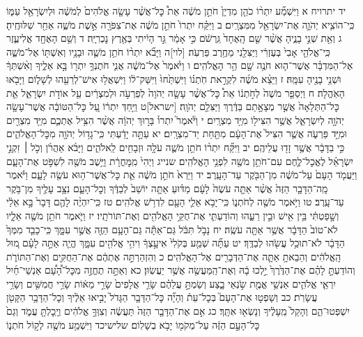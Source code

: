 \documentclass[twoside, openany, parskip=half, 11pt]{book}
\begin{document}
יד יתרויח א וַיִּשְׁמַ֞ע יִתְר֨וֹ כֹהֵ֤ן מִדְיָן֙ חֹתֵ֣ן מֹשֶׁ֔ה אֵת֩ כׇּל־אֲשֶׁ֨ר עָשָׂ֤ה אֱלֹהִים֙ לְמֹשֶׁ֔ה וּלְיִשְׂרָאֵ֖ל עַמּ֑וֹ כִּֽי־הוֹצִ֧יא יְהֹוָ֛ה אֶת־יִשְׂרָאֵ֖ל מִמִּצְרָֽיִם׃ ב וַיִּקַּ֗ח יִתְרוֹ֙ חֹתֵ֣ן מֹשֶׁ֔ה אֶת־צִפֹּרָ֖ה אֵ֣שֶׁת מֹשֶׁ֑ה אַחַ֖ר שִׁלּוּחֶֽיהָ׃ ג וְאֵ֖ת שְׁנֵ֣י בָנֶ֑יהָ אֲשֶׁ֨ר שֵׁ֤ם הָֽאֶחָד֙ גֵּֽרְשֹׁ֔ם כִּ֣י אָמַ֔ר גֵּ֣ר הָיִ֔יתִי בְּאֶ֖רֶץ נׇכְרִיָּֽה׃ ד וְשֵׁ֥ם הָאֶחָ֖ד אֱלִיעֶ֑זֶר כִּֽי־אֱלֹהֵ֤י אָבִי֙ בְּעֶזְרִ֔י וַיַּצִּלֵ֖נִי מֵחֶ֥רֶב פַּרְעֹֽה׃ [לוי]ה וַיָּבֹ֞א יִתְר֨וֹ חֹתֵ֥ן מֹשֶׁ֛ה וּבָנָ֥יו וְאִשְׁתּ֖וֹ אֶל־מֹשֶׁ֑ה אֶל־הַמִּדְבָּ֗ר אֲשֶׁר־ה֛וּא חֹנֶ֥ה שָׁ֖ם הַ֥ר הָאֱלֹהִֽים׃ ו וַיֹּ֙אמֶר֙ אֶל־מֹשֶׁ֔ה אֲנִ֛י חֹתֶנְךָ֥ יִתְר֖וֹ בָּ֣א אֵלֶ֑יךָ וְאִ֨שְׁתְּךָ֔ וּשְׁנֵ֥י בָנֶ֖יהָ עִמָּֽהּ׃ ז וַיֵּצֵ֨א מֹשֶׁ֜ה לִקְרַ֣את חֹֽתְנ֗וֹ וַיִּשְׁתַּ֙חוּ֙ וַיִּשַּׁק־ל֔וֹ וַיִּשְׁאֲל֥וּ אִישׁ־לְרֵעֵ֖הוּ לְשָׁל֑וֹם וַיָּבֹ֖אוּ הָאֹֽהֱלָה׃ ח וַיְסַפֵּ֤ר מֹשֶׁה֙ לְחֹ֣תְנ֔וֹ אֵת֩ כׇּל־אֲשֶׁ֨ר עָשָׂ֤ה יְהֹוָה֙ לְפַרְעֹ֣ה וּלְמִצְרַ֔יִם עַ֖ל אוֹדֹ֣ת יִשְׂרָאֵ֑ל אֵ֤ת כׇּל־הַתְּלָאָה֙ אֲשֶׁ֣ר מְצָאָ֣תַם בַּדֶּ֔רֶךְ וַיַּצִּלֵ֖ם יְהֹוָֽה׃ [ישראל]ט וַיִּ֣חַדְּ יִתְר֔וֹ עַ֚ל כׇּל־הַטּוֹבָ֔ה אֲשֶׁר־עָשָׂ֥ה יְהֹוָ֖ה לְיִשְׂרָאֵ֑ל אֲשֶׁ֥ר הִצִּיל֖וֹ מִיַּ֥ד מִצְרָֽיִם׃ י וַיֹּ֘אמֶר֮ יִתְרוֹ֒ בָּר֣וּךְ יְהֹוָ֔ה אֲשֶׁ֨ר הִצִּ֥יל אֶתְכֶ֛ם מִיַּ֥ד מִצְרַ֖יִם וּמִיַּ֣ד פַּרְעֹ֑ה אֲשֶׁ֤ר הִצִּיל֙ אֶת־הָעָ֔ם מִתַּ֖חַת יַד־מִצְרָֽיִם׃ יא עַתָּ֣ה יָדַ֔עְתִּי כִּֽי־גָד֥וֹל יְהֹוָ֖ה מִכׇּל־הָאֱלֹהִ֑ים כִּ֣י בַדָּבָ֔ר אֲשֶׁ֥ר זָד֖וּ עֲלֵיהֶֽם׃ יב וַיִּקַּ֞ח יִתְר֨וֹ חֹתֵ֥ן מֹשֶׁ֛ה עֹלָ֥ה וּזְבָחִ֖ים לֵֽאלֹהִ֑ים וַיָּבֹ֨א אַהֲרֹ֜ן וְכֹ֣ל ׀ זִקְנֵ֣י יִשְׂרָאֵ֗ל לֶאֱכׇל־לֶ֛חֶם עִם־חֹתֵ֥ן מֹשֶׁ֖ה לִפְנֵ֥י הָאֱלֹהִֽים׃ שנייג וַיְהִי֙ מִֽמׇּחֳרָ֔ת וַיֵּ֥שֶׁב מֹשֶׁ֖ה לִשְׁפֹּ֣ט אֶת־הָעָ֑ם וַיַּעֲמֹ֤ד הָעָם֙ עַל־מֹשֶׁ֔ה מִן־הַבֹּ֖קֶר עַד־הָעָֽרֶב׃ יד וַיַּרְא֙ חֹתֵ֣ן מֹשֶׁ֔ה אֵ֛ת כׇּל־אֲשֶׁר־ה֥וּא עֹשֶׂ֖ה לָעָ֑ם וַיֹּ֗אמֶר מָֽה־הַדָּבָ֤ר הַזֶּה֙ אֲשֶׁ֨ר אַתָּ֤ה עֹשֶׂה֙ לָעָ֔ם מַדּ֗וּעַ אַתָּ֤ה יוֹשֵׁב֙ לְבַדֶּ֔ךָ וְכׇל־הָעָ֛ם נִצָּ֥ב עָלֶ֖יךָ מִן־בֹּ֥קֶר עַד־עָֽרֶב׃ טו וַיֹּ֥אמֶר מֹשֶׁ֖ה לְחֹתְנ֑וֹ כִּֽי־יָבֹ֥א אֵלַ֛י הָעָ֖ם לִדְרֹ֥שׁ אֱלֹהִֽים׃ טז כִּֽי־יִהְיֶ֨ה לָהֶ֤ם דָּבָר֙ בָּ֣א אֵלַ֔י וְשָׁ֣פַטְתִּ֔י בֵּ֥ין אִ֖ישׁ וּבֵ֣ין רֵעֵ֑הוּ וְהוֹדַעְתִּ֛י אֶת־חֻקֵּ֥י הָאֱלֹהִ֖ים וְאֶת־תּוֹרֹתָֽיו׃ יז וַיֹּ֛אמֶר חֹתֵ֥ן מֹשֶׁ֖ה אֵלָ֑יו לֹא־טוֹב֙ הַדָּבָ֔ר אֲשֶׁ֥ר אַתָּ֖ה עֹשֶֽׂה׃ יח נָבֹ֣ל תִּבֹּ֔ל גַּם־אַתָּ֕ה גַּם־הָעָ֥ם הַזֶּ֖ה אֲשֶׁ֣ר עִמָּ֑ךְ כִּֽי־כָבֵ֤ד מִמְּךָ֙ הַדָּבָ֔ר לֹא־תוּכַ֥ל עֲשֹׂ֖הוּ לְבַדֶּֽךָ׃ יט עַתָּ֞ה שְׁמַ֤ע בְּקֹלִי֙ אִיעָ֣צְךָ֔ וִיהִ֥י אֱלֹהִ֖ים עִמָּ֑ךְ הֱיֵ֧ה אַתָּ֣ה לָעָ֗ם מ֚וּל הָֽאֱלֹהִ֔ים וְהֵבֵאתָ֥ אַתָּ֛ה אֶת־הַדְּבָרִ֖ים אֶל־הָאֱלֹהִֽים׃ כ וְהִזְהַרְתָּ֣ה אֶתְהֶ֔ם אֶת־הַחֻקִּ֖ים וְאֶת־הַתּוֹרֹ֑ת וְהוֹדַעְתָּ֣ לָהֶ֗ם אֶת־הַדֶּ֙רֶךְ֙ יֵ֣לְכוּ בָ֔הּ וְאֶת־הַֽמַּעֲשֶׂ֖ה אֲשֶׁ֥ר יַעֲשֽׂוּן׃ כא וְאַתָּ֣ה תֶחֱזֶ֣ה מִכׇּל־הָ֠עָ֠ם אַנְשֵׁי־חַ֜יִל יִרְאֵ֧י אֱלֹהִ֛ים אַנְשֵׁ֥י אֱמֶ֖ת שֹׂ֣נְאֵי בָ֑צַע וְשַׂמְתָּ֣ עֲלֵהֶ֗ם שָׂרֵ֤י אֲלָפִים֙ שָׂרֵ֣י מֵא֔וֹת שָׂרֵ֥י חֲמִשִּׁ֖ים וְשָׂרֵ֥י עֲשָׂרֹֽת׃ כב וְשָׁפְט֣וּ אֶת־הָעָם֮ בְּכׇל־עֵת֒ וְהָיָ֞ה כׇּל־הַדָּבָ֤ר הַגָּדֹל֙ יָבִ֣יאוּ אֵלֶ֔יךָ וְכׇל־הַדָּבָ֥ר הַקָּטֹ֖ן יִשְׁפְּטוּ־הֵ֑ם וְהָקֵל֙ מֵֽעָלֶ֔יךָ וְנָשְׂא֖וּ אִתָּֽךְ׃ כג אִ֣ם אֶת־הַדָּבָ֤ר הַזֶּה֙ תַּעֲשֶׂ֔ה וְצִוְּךָ֣ אֱלֹהִ֔ים וְיָֽכׇלְתָּ֖ עֲמֹ֑ד וְגַם֙ כׇּל־הָעָ֣ם הַזֶּ֔ה עַל־מְקֹמ֖וֹ יָבֹ֥א בְשָׁלֽוֹם׃ שלישיכד וַיִּשְׁמַ֥ע מֹשֶׁ֖ה לְק֣וֹל חֹתְנ֑וֹ 
\end{document}
